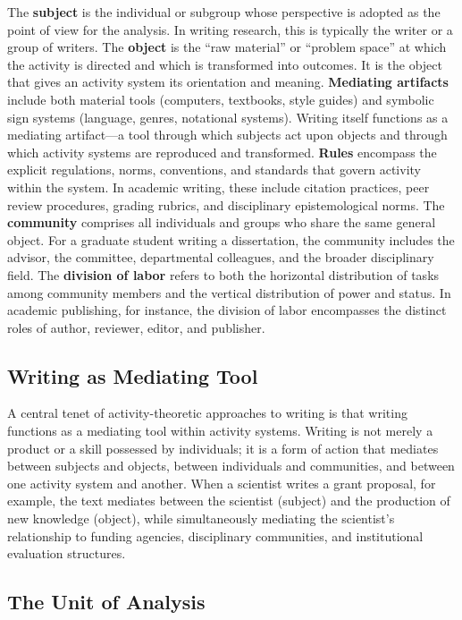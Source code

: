 \documentclass[12pt]{article}
\begin{document}
The \textbf{subject} is the individual or subgroup whose perspective is adopted as the point of view for the analysis. In writing research, this is typically the writer or a group of writers. The \textbf{object} is the ``raw material'' or ``problem space'' at which the activity is directed and which is transformed into outcomes. It is the object that gives an activity system its orientation and meaning. \textbf{Mediating artifacts} include both material tools (computers, textbooks, style guides) and symbolic sign systems (language, genres, notational systems). Writing itself functions as a mediating artifact---a tool through which subjects act upon objects and through which activity systems are reproduced and transformed. \textbf{Rules} encompass the explicit regulations, norms, conventions, and standards that govern activity within the system. In academic writing, these include citation practices, peer review procedures, grading rubrics, and disciplinary epistemological norms. The \textbf{community} comprises all individuals and groups who share the same general object. For a graduate student writing a dissertation, the community includes the advisor, the committee, departmental colleagues, and the broader disciplinary field. The \textbf{division of labor} refers to both the horizontal distribution of tasks among community members and the vertical distribution of power and status. In academic publishing, for instance, the division of labor encompasses the distinct roles of author, reviewer, editor, and publisher.

\subsection{Writing as Mediating Tool}

A central tenet of activity-theoretic approaches to writing is that writing functions as a mediating tool within activity systems. Writing is not merely a product or a skill possessed by individuals; it is a form of action that mediates between subjects and objects, between individuals and communities, and between one activity system and another. When a scientist writes a grant proposal, for example, the text mediates between the scientist (subject) and the production of new knowledge (object), while simultaneously mediating the scientist's relationship to funding agencies, disciplinary communities, and institutional evaluation structures.

\subsection{The Unit of Analysis}
\end{document}
